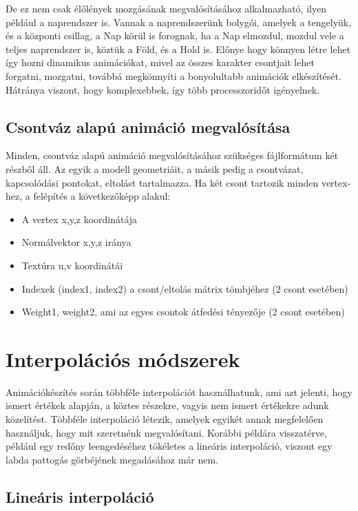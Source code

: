De ez nem csak élőlények mozgásának megvalósításához alkalmazható, ilyen például a naprendszer is. Vannak a naprendszerünk bolygói, amelyek a tengelyük, és a központi csillag, a Nap körül is forognak, ha a Nap elmozdul, mozdul vele a teljes naprendszer is, köztük a Föld, és a Hold is. Előnye hogy könnyen létre lehet így hozni dinamikus animációkat, mivel az összes karakter csontjait lehet forgatni, mozgatni, továbbá megkönnyíti a bonyolultabb animációk elkészítését. Hátránya viszont, hogy komplexebbek, így több processzoridőt igényelnek.

\subsection{Csontváz alapú animáció megvalósítása}

Minden, csontváz alapú animáció megvalósításához szükséges fájlformátum két részből áll. Az egyik a modell geometriáit, a másik pedig a csontvázat, kapcsolódási pontokat, eltolást tartalmazza. Ha két csont tartozik minden vertex-hez, a felépítés a következőképp alakul:
\begin{itemize}
\item A vertex x,y,z koordinátája
\item Normálvektor x,y,z iránya
\item Textúra u,v koordinátái
\item Indexek (index1, index2) a csont/eltolás mátrix tömbjéhez (2 csont esetében)
\item Weight1, weight2, ami az egyes csontok átfedési tényezője (2 csont esetében)
\end{itemize}

\section{Interpolációs módszerek}


Animációkészítés során többféle interpolációt használhatunk, ami azt jelenti, hogy ismert értékek alapján, a köztes részekre, vagyis nem ismert értékekre adunk közelítést. Többféle interpoláció létezik, amelyek egyikét annak megfelelően használjuk, hogy mit szeretnénk megvalósítani. Korábbi példára visszatérve, például egy redőny leengedéséhez tökéletes a lineáris interpoláció, viszont egy labda pattogás görbéjének megadásához már nem.

\subsection{Lineáris interpoláció}

